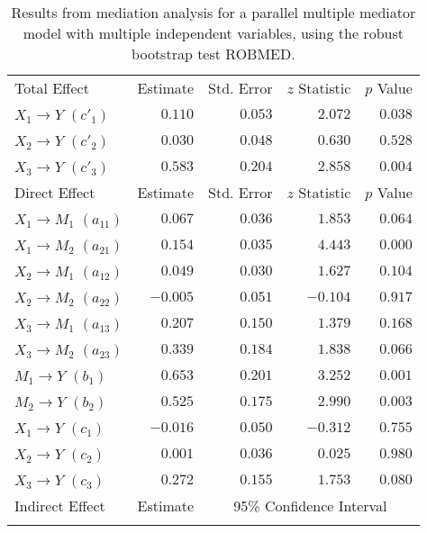 \documentclass{article}\usepackage[]{graphicx}\usepackage[]{xcolor}
\begin{document}
\begin{table}[h!]
\caption{Results from mediation analysis for a parallel multiple mediator model with multiple independent variables, using the robust bootstrap test ROBMED.}
\begin{center}
\begin{tabular}{lrrrr}
\hline\noalign{\smallskip}
Total Effect & Estimate & Std. Error & $z$ Statistic & $p$ Value \\ 
\noalign{\smallskip}\hline\noalign{\smallskip}
$X_{1} \rightarrow Y$ $(c'_{1})$ & $ 0.110$ & $ 0.053$ & $ 2.072$ & $ 0.038$ \\ 
$X_{2} \rightarrow Y$ $(c'_{2})$ & $ 0.030$ & $ 0.048$ & $ 0.630$ & $ 0.528$ \\ 
$X_{3} \rightarrow Y$ $(c'_{3})$ & $ 0.583$ & $ 0.204$ & $ 2.858$ & $ 0.004$ \\ 
\noalign{\smallskip}\hline\noalign{\smallskip}
Direct Effect & Estimate & Std. Error & $z$ Statistic & $p$ Value \\ 
\noalign{\smallskip}\hline\noalign{\smallskip}
$X_{1} \rightarrow M_{1}$ $(a_{11})$ & $ 0.067$ & $ 0.036$ & $ 1.853$ & $ 0.064$ \\ 
$X_{1} \rightarrow M_{2}$ $(a_{21})$ & $ 0.154$ & $ 0.035$ & $ 4.443$ & $ 0.000$ \\ 
$X_{2} \rightarrow M_{1}$ $(a_{12})$ & $ 0.049$ & $ 0.030$ & $ 1.627$ & $ 0.104$ \\ 
$X_{2} \rightarrow M_{2}$ $(a_{22})$ & $-0.005$ & $ 0.051$ & $-0.104$ & $ 0.917$ \\ 
$X_{3} \rightarrow M_{1}$ $(a_{13})$ & $ 0.207$ & $ 0.150$ & $ 1.379$ & $ 0.168$ \\ 
$X_{3} \rightarrow M_{2}$ $(a_{23})$ & $ 0.339$ & $ 0.184$ & $ 1.838$ & $ 0.066$ \\ 
$M_{1} \rightarrow Y$ $(b_{1})$ & $ 0.653$ & $ 0.201$ & $ 3.252$ & $ 0.001$ \\ 
$M_{2} \rightarrow Y$ $(b_{2})$ & $ 0.525$ & $ 0.175$ & $ 2.990$ & $ 0.003$ \\ 
$X_{1} \rightarrow Y$ $(c_{1})$ & $-0.016$ & $ 0.050$ & $-0.312$ & $ 0.755$ \\ 
$X_{2} \rightarrow Y$ $(c_{2})$ & $ 0.001$ & $ 0.036$ & $ 0.025$ & $ 0.980$ \\ 
$X_{3} \rightarrow Y$ $(c_{3})$ & $ 0.272$ & $ 0.155$ & $ 1.753$ & $ 0.080$ \\ 
\noalign{\smallskip}\hline\noalign{\smallskip}
Indirect Effect & Estimate & \multicolumn{3}{c}{95\% Confidence Interval} \\ 
\noalign{\smallskip}\hline\noalign{\smallskip}

\end{tabular}
\end{center}
\end{table}
\end{document}
